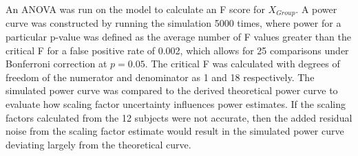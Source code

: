 An ANOVA was run on the model to calculate an F score for $X_{Group}$. A power curve was constructed by running the simulation 5000 times, where power for a particular p-value was defined as the average number of F values greater than the critical F for a false positive rate of 0.002, which allows for 25 comparisons under Bonferroni correction at $p=0.05$. The critical F was calculated with degrees of freedom of the numerator and denominator as 1 and 18 respectively. The simulated power curve was compared to the derived theoretical power curve to evaluate how scaling factor uncertainty influences power estimates. If the scaling factors calculated from the 12 subjects were not accurate, then the added residual noise from the scaling factor estimate would result in the simulated power curve deviating largely from the theoretical curve.